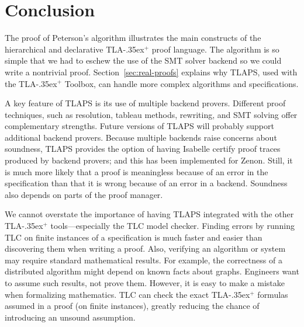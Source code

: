 \documentclass[a4paper,draft]{llncs}
\newcommand{\tlaplus}{\mbox{TLA\kern -.35ex$^+$}\xspace}
\begin{document}



\section{Conclusion}
\label{sec:conclusion}

The proof of Peterson's algorithm illustrates the main constructs of the
hierarchical and declarative \tlaplus proof language. The algorithm is so simple
that we had to eschew the use of the SMT solver backend so we could write a
nontrivial proof. Section~\ref{sec:real-proofs} explains why TLAPS, used with
the \tlaplus Toolbox, can handle more complex algorithms and specifications.

A key feature of TLAPS is its use of multiple backend provers.
Different proof techniques, such as resolution, tableau methods,
rewriting, and SMT solving offer complementary strengths.  Future
versions of TLAPS will probably support additional backend provers.
Because multiple backends raise concerns about soundness, TLAPS
provides the option of having Isabelle certify proof traces produced
by backend provers; and this has been implemented for Zenon.  Still,
it is much more likely that a proof is meaningless because of an error
in the specification than that it is wrong because of an error in a
backend.  Soundness also depends on parts of the proof manager.

We cannot overstate the importance of having TLAPS integrated with the
other \tlaplus tools---especially the TLC model checker.  Finding
errors by running TLC on finite instances of a specification is much
faster and easier than discovering them when writing a proof.
%
%
Also, verifying an algorithm or system may require standard
mathematical results.  For example, the correctness of a distributed
algorithm might depend on known facts about graphs.  Engineers want to
assume such results, not prove them.  However, it is easy to make a
mistake when formalizing mathematics.  TLC can check the exact
\tlaplus formulas assumed in a proof (on finite instances), greatly reducing the chance of
introducing an unsound assumption.
\end{document}

